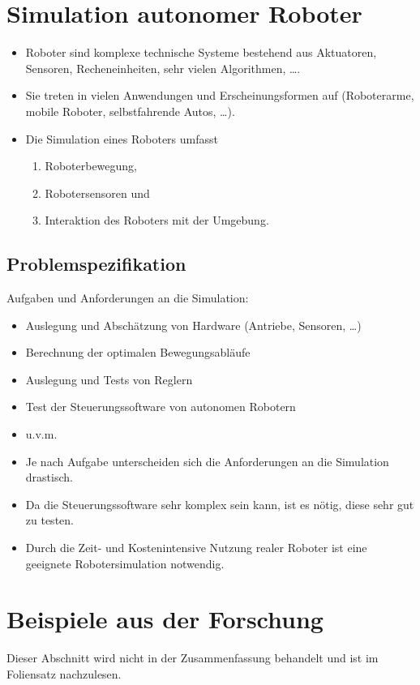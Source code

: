 \documentclass[a4paper, 11pt, accentcolor = tud3b]{tudreport}
\begin{document}
    \chapter{Simulation autonomer Roboter} %
        \begin{itemize}
        	\item Roboter sind komplexe technische Systeme bestehend aus Aktuatoren, Sensoren, Recheneinheiten, sehr vielen Algorithmen, \dots.
        	\item Sie treten in vielen Anwendungen und Erscheinungsformen auf (Roboterarme, mobile Roboter, selbstfahrende Autos, \dots).
        	\item Die Simulation eines Roboters umfasst
	        	\begin{enumerate}
	        		\item Roboterbewegung,
	        		\item Robotersensoren und
	        		\item Interaktion des Roboters mit der Umgebung.
	        	\end{enumerate}
        \end{itemize}

        \section{Problemspezifikation} %
	        Aufgaben und Anforderungen an die Simulation:
            \begin{itemize}
            	\item Auslegung und Abschätzung von Hardware (Antriebe, Sensoren, \dots)
            	\item Berechnung der optimalen Bewegungsabläufe
            	\item Auslegung und Tests von Reglern
            	\item Test der Steuerungssoftware von autonomen Robotern
            	\item u.v.m.
            	\item Je nach Aufgabe unterscheiden sich die Anforderungen an die Simulation drastisch.
            	\item Da die Steuerungssoftware sehr komplex sein kann, ist es nötig, diese sehr gut zu testen.
            	\item Durch die Zeit- und Kostenintensive Nutzung realer Roboter ist eine geeignete Robotersimulation notwendig.
            \end{itemize}
    
    \chapter{Beispiele aus der Forschung} %
	    Dieser Abschnitt wird nicht in der Zusammenfassung behandelt und ist im Foliensatz nachzulesen.
\end{document}
